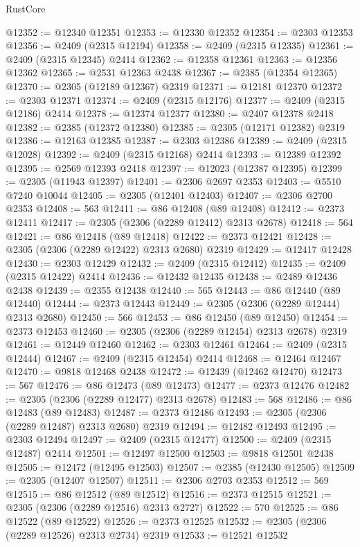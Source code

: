 \begin{lexlean}{RustCore}
\begin{coremodule}
@12352 := @12340 @12351
@12353 := @12330 @12352
@12354 := @2303 @12353
@12356 := @2409 (@2315 @12194)
@12358 := @2409 (@2315 @12335)
@12361 := @2409 (@2315 @12345) @2414
@12362 := @12358 @12361
@12363 := @12356 @12362
@12365 := @2531 @12363 @2438
@12367 := @2385 (@12354 @12365)
@12370 := @2305 (@12189 @12367) @2319
@12371 := @12181 @12370
@12372 := @2303 @12371
@12374 := @2409 (@2315 @12176)
@12377 := @2409 (@2315 @12186) @2414
@12378 := @12374 @12377
@12380 := @2407 @12378 @2418
@12382 := @2385 (@12372 @12380)
@12385 := @2305 (@12171 @12382) @2319
@12386 := @12163 @12385
@12387 := @2303 @12386
@12389 := @2409 (@2315 @12028)
@12392 := @2409 (@2315 @12168) @2414
@12393 := @12389 @12392
@12395 := @2569 @12393 @2418
@12397 := @12023 (@12387 @12395)
@12399 := @2305 (@11943 @12397)
@12401 := @2306 @2697 @2353
@12403 := @5510 @7240 @10044
@12405 := @2305 (@12401 @12403)
@12407 := @2306 @2700 @2353
@12408 := 563
@12411 := @86 @12408 (@89 @12408)
@12412 := @2373 @12411
@12417 := @2305 (@2306 (@2289 @12412) @2313 @2678)
@12418 := 564
@12421 := @86 @12418 (@89 @12418)
@12422 := @2373 @12421
@12428 := @2305 (@2306 (@2289 @12422) @2313 @2680) @2319
@12429 := @12417 @12428
@12430 := @2303 @12429
@12432 := @2409 (@2315 @12412)
@12435 := @2409 (@2315 @12422) @2414
@12436 := @12432 @12435
@12438 := @2489 @12436 @2438
@12439 := @2355 @12438
@12440 := 565
@12443 := @86 @12440 (@89 @12440)
@12444 := @2373 @12443
@12449 := @2305 (@2306 (@2289 @12444) @2313 @2680)
@12450 := 566
@12453 := @86 @12450 (@89 @12450)
@12454 := @2373 @12453
@12460 := @2305 (@2306 (@2289 @12454) @2313 @2678) @2319
@12461 := @12449 @12460
@12462 := @2303 @12461
@12464 := @2409 (@2315 @12444)
@12467 := @2409 (@2315 @12454) @2414
@12468 := @12464 @12467
@12470 := @9818 @12468 @2438
@12472 := @12439 (@12462 @12470)
@12473 := 567
@12476 := @86 @12473 (@89 @12473)
@12477 := @2373 @12476
@12482 := @2305 (@2306 (@2289 @12477) @2313 @2678)
@12483 := 568
@12486 := @86 @12483 (@89 @12483)
@12487 := @2373 @12486
@12493 := @2305 (@2306 (@2289 @12487) @2313 @2680) @2319
@12494 := @12482 @12493
@12495 := @2303 @12494
@12497 := @2409 (@2315 @12477)
@12500 := @2409 (@2315 @12487) @2414
@12501 := @12497 @12500
@12503 := @9818 @12501 @2438
@12505 := @12472 (@12495 @12503)
@12507 := @2385 (@12430 @12505)
@12509 := @2305 (@12407 @12507)
@12511 := @2306 @2703 @2353
@12512 := 569
@12515 := @86 @12512 (@89 @12512)
@12516 := @2373 @12515
@12521 := @2305 (@2306 (@2289 @12516) @2313 @2727)
@12522 := 570
@12525 := @86 @12522 (@89 @12522)
@12526 := @2373 @12525
@12532 := @2305 (@2306 (@2289 @12526) @2313 @2734) @2319
@12533 := @12521 @12532

\end{coremodule}
\end{lexlean}
